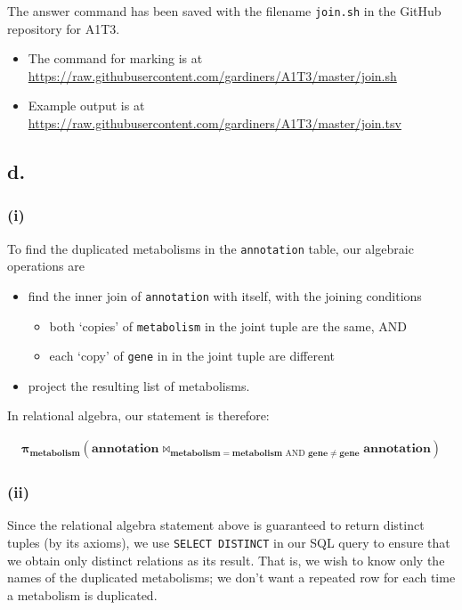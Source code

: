 \documentclass{article}
\begin{document}
The answer command has been saved with the filename \texttt{join.sh} in the GitHub repository for A1T3.
\begin{itemize}
    \item The command for marking is at \url{https://raw.githubusercontent.com/gardiners/A1T3/master/join.sh}
    \item Example output is at \url{https://raw.githubusercontent.com/gardiners/A1T3/master/join.tsv}
\end{itemize}

\subsection{d.}

\subsubsection{(i)}

To find the duplicated metabolisms in the \texttt{annotation} table, our algebraic operations are
\begin{itemize}
    \item find the inner join of \texttt{annotation} with itself, with the joining conditions
    \begin{itemize}
        \item both `copies' of \texttt{metabolism} in the joint tuple are the same, AND
        \item each `copy' of \texttt{gene} in in the joint tuple are different
    \end{itemize}
    \item project the resulting list of metabolisms.
\end{itemize}

In relational algebra, our statement is therefore:

$$
\begin{aligned}
\boldsymbol{\pi}_\mathbf{metabolism}
\left(
    \mathbf{annotation} \bowtie_{\mathbf{metabolism} = \mathbf{metabolism} \text{ AND }
        \mathbf{gene} \ne \mathbf{gene}} \mathbf{annotation}
\right)
\end{aligned}
$$

\subsubsection{(ii)}

Since the relational algebra statement above is guaranteed to return distinct tuples (by its axioms), we use \texttt{SELECT DISTINCT} in our SQL query to ensure that we obtain only distinct relations as its result. That is, we wish to know only the names of the duplicated metabolisms; we don't want a repeated row for each time a metabolism is duplicated.
\end{document}
